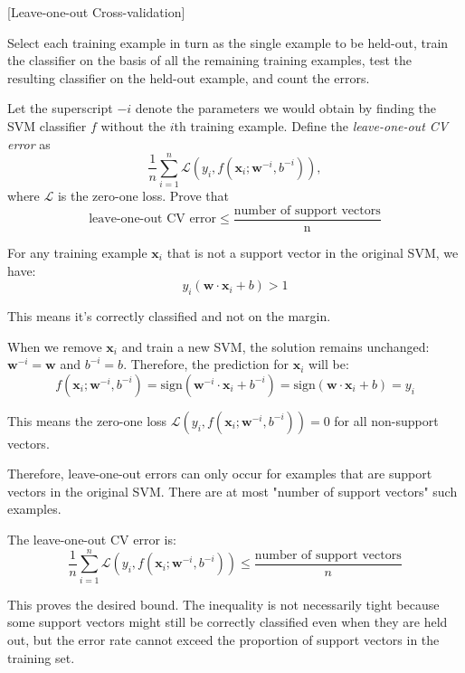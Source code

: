 \item {} [Leave-one-out Cross-validation]

Select each training example in turn as the single example to be held-out, train the classifier on the basis of all the remaining training examples, test the resulting classifier on the held-out example, and count the errors.

Let the superscript $-i$ denote the parameters we would obtain by finding the SVM classifier $f$ without the $i$th training example. Define the \textit{leave-one-out CV error} as
\begin{equation}
    \frac{1}{n}\sum_{i=1}^n\mathcal{L}(y_i,f(\mathbf{x}_i;\mathbf{w}^{-i},b^{-i})),
\end{equation}
where $\mathcal{L}$ is the zero-one loss. Prove that
\begin{equation}
    \text{leave-one-out CV error}\leq \frac{\text{number of support vectors}}{\text{n}}
\end{equation}

\solution

For any training example $\mathbf{x}_i$ that is not a support vector in the original SVM, we have:
\begin{equation*}
    y_i(\mathbf{w} \cdot \mathbf{x}_i + b) > 1
\end{equation*}

This means it's correctly classified and not on the margin.

When we remove $\mathbf{x}_i$ and train a new SVM, the solution remains unchanged: $\mathbf{w}^{-i} = \mathbf{w}$ and $b^{-i} = b$. Therefore, the prediction for $\mathbf{x}_i$ will be:
\begin{equation*}
    f(\mathbf{x}_i; \mathbf{w}^{-i}, b^{-i}) = \text{sign}(\mathbf{w}^{-i} \cdot \mathbf{x}_i + b^{-i}) = \text{sign}(\mathbf{w} \cdot \mathbf{x}_i + b) = y_i
\end{equation*}

This means the zero-one loss $\mathcal{L}(y_i, f(\mathbf{x}_i; \mathbf{w}^{-i}, b^{-i})) = 0$ for all non-support vectors.

Therefore, leave-one-out errors can only occur for examples that are support vectors in the original SVM. There are at most "number of support vectors" such examples.

The leave-one-out CV error is:
\begin{equation*}
    \frac{1}{n}\sum_{i=1}^n\mathcal{L}(y_i,f(\mathbf{x}_i;\mathbf{w}^{-i},b^{-i})) \leq \frac{\text{number of support vectors}}{n}
\end{equation*}

This proves the desired bound. The inequality is not necessarily tight because some support vectors might still be correctly classified even when they are held out, but the error rate cannot exceed the proportion of support vectors in the training set.

\newpage
